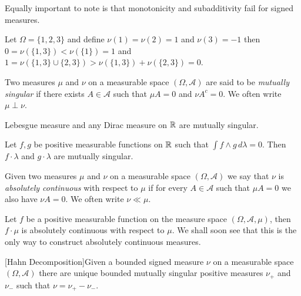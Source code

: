 Equally important to note is that monotonicity and subadditivity fail for signed measures.
\begin{examp}Let $\Omega = \lbrace 1,2,3 \rbrace$ and define $\nu(1) = \nu(2) = 1$ and $\nu(3) = -1$ then $0=\nu(\lbrace 1,3 \rbrace) < \nu(\lbrace 1 \rbrace)=1$ and $1 = \nu(\lbrace 1,3 \rbrace \cup \lbrace 2,3 \rbrace) > \nu(\lbrace 1,3 \rbrace) +  \nu(\lbrace 2,3 \rbrace) = 0$.
\end{examp}

\begin{defn}Two measures $\mu$ and $\nu$ on a measurable space $(\Omega,
  \mathcal{A})$ are said to be \emph{mutually singular} if there
  exists $A \in \mathcal{A}$ such that $\mu A = 0$ and $\nu A^c = 0$.
  We often write $\mu \perp \nu$.
\end{defn}
\begin{examp}Lebesgue measure and any Dirac measure on $\mathbb{R}$ are
  mutually singular.
\end{examp}
\begin{examp}Let $f,g$ be positive measurable functions on $\mathbb{R}$
  such that $\int f \wedge g \, d\lambda= 0$.  Then $f \cdot \lambda$ and $g
  \cdot \lambda$ are mutually singular.
\end{examp}
\begin{defn}Given two measures $\mu$ and $\nu$ on a measurable space $(\Omega,
  \mathcal{A})$ we say that $\nu$ is \emph{absolutely continuous} with
  respect to $\mu$ if for every $A \in \mathcal{A}$ such that $\mu A =
  0 $ we also have $\nu A = 0$.
  We often write $\nu \ll \mu$.
\end{defn}
\begin{examp}Let $f$ be a positive measurable function on the measure
  space $(\Omega,
  \mathcal{A}, \mu)$, then $f \cdot \mu$ is absolutely continuous with
  respect to $\mu$.  We shall soon see that this is the only way to
  construct absolutely continuous measures.
\end{examp}
\begin{thm}\label{HahnDecomposition}[Hahn Decomposition]Given a
  bounded signed measure $\nu$ on a measurable space $(\Omega,
  \mathcal{A})$ there are unique bounded mutually singular positive
  measures $\nu_+$ and $\nu_-$ such that $\nu = \nu_+ - \nu_-$.
\end{thm}
